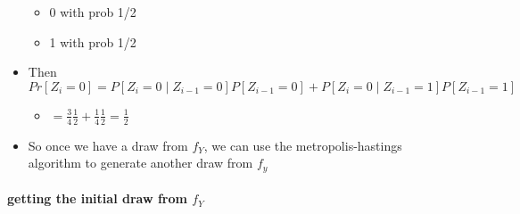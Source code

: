 \begin{itemize}
\begin{itemize}
\item 0 with prob 1/2
\item 1 with prob 1/2
\end{itemize}
\item Then $Pr[Z_i = 0] = P[Z_i = 0 \mid Z_{i-1}=0] P[Z_{i-1} = 0] + P[Z_i = 0 \mid Z_{i-1}=1] P[Z_{i-1} = 1]$
\begin{itemize}
\item $= \frac{3}{4} \frac{1}{2} + \frac{1}{4} \frac{1}{2} = \frac12$
\end{itemize}
\item So once we have a draw from $f_Y$, we can use the
        metropolis-hastings algorithm to generate another draw from $f_y$
\end{itemize}
\paragraph{getting the initial draw from $f_Y$}
\label{sec-3-2-2}

